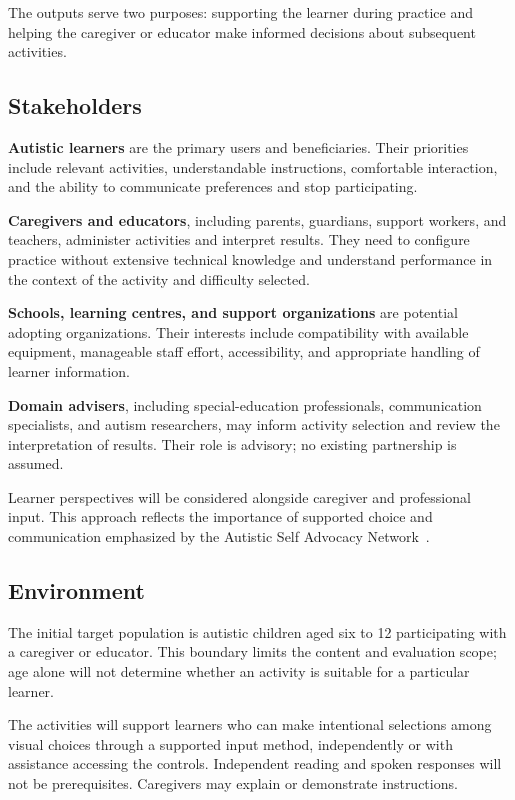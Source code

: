 \documentclass{article}
\begin{document}
The outputs serve two purposes: supporting the learner during practice and
helping the caregiver or educator make informed decisions about subsequent
activities.

\FloatBarrier

\subsection{Stakeholders}

\textbf{Autistic learners} are the primary users and beneficiaries. Their
priorities include relevant activities, understandable instructions, comfortable
interaction, and the ability to communicate preferences and
stop participating.

\textbf{Caregivers and educators}, including parents, guardians, support
workers, and teachers, administer activities and interpret results. They need to
configure practice without extensive technical knowledge and understand
performance in the context of the activity and difficulty selected.

\textbf{Schools, learning centres, and support organizations} are potential
adopting organizations. Their interests include compatibility with available
equipment, manageable staff effort, accessibility, and appropriate handling of
learner information.

\textbf{Domain advisers}, including special-education professionals,
communication specialists, and autism researchers, may inform activity selection
and review the interpretation of results. Their role is advisory; no existing
partnership is assumed.

Learner perspectives will be considered alongside caregiver and professional
input. This approach reflects the importance of supported choice and
communication emphasized by the Autistic Self Advocacy
Network~\citep{asanChoice}.

\subsection{Environment}

The initial target population is autistic children aged six to 12
participating with a caregiver or educator. This boundary limits the content and
evaluation scope; age alone will not determine whether an activity is suitable
for a particular learner.

The activities will support learners who can make intentional selections among
visual choices through a supported input method, independently or with
assistance accessing the controls. Independent reading and spoken responses will
not be prerequisites. Caregivers may explain or demonstrate instructions.
\end{document}
